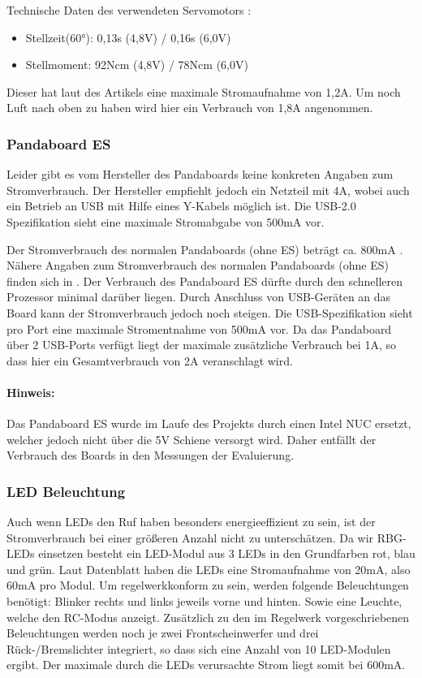 Technische Daten des verwendeten Servomotors \cite{website-servo-dat}:
\begin{itemize}
 \item Stellzeit(60°): 0,13s (4,8V) / 0,16s (6,0V)
 \item Stellmoment: 92Ncm (4,8V) / 78Ncm (6,0V)
\end{itemize}



Dieser hat laut des Artikels eine maximale Stromaufnahme von 1,2A. Um noch Luft nach oben zu haben wird hier ein Verbrauch von 
1,8A angenommen.

\subsubsection{Pandaboard ES}
Leider gibt es vom Hersteller des Pandaboards keine konkreten Angaben zum Stromverbrauch. Der Hersteller empfiehlt jedoch ein
Netzteil mit 4A\cite{website-panda-supply}, wobei auch ein Betrieb an USB mit Hilfe eines Y-Kabels möglich ist. Die USB-2.0 Spezifikation\cite{website-usb-spec} sieht eine maximale 
Stromabgabe von 500mA vor.

Der Stromverbrauch des normalen Pandaboards (ohne ES) beträgt ca. 800mA \cite{website-panda-power}.
Nähere Angaben zum Stromverbrauch des normalen Pandaboards (ohne ES) finden sich in \cite{website-panda-power}.
Der Verbrauch des Pandaboard ES dürfte durch den schnelleren Prozessor minimal darüber liegen. 
Durch Anschluss von USB-Geräten an das Board kann der Stromverbrauch jedoch noch steigen. Die USB-Spezifikation \cite{website-usb-spec}
sieht pro Port eine maximale Stromentnahme von 500mA vor. Da das Pandaboard über 2 USB-Ports verfügt liegt der maximale zusätzliche Verbrauch bei 1A,
so dass hier ein Gesamtverbrauch von 2A veranschlagt wird.

\paragraph{Hinweis:}
Das Pandaboard ES wurde im Laufe des Projekts durch einen Intel NUC ersetzt, welcher jedoch nicht über die 5V Schiene versorgt wird.
Daher entfällt der Verbrauch des Boards in den Messungen der Evaluierung.

\subsubsection{LED Beleuchtung}
Auch wenn LEDs den Ruf haben besonders energieeffizient zu sein, ist der Stromverbrauch bei einer größeren Anzahl nicht zu
unterschätzen. Da wir RBG-LEDs einsetzen besteht ein LED-Modul aus 3 LEDs in den Grundfarben rot, blau und grün.
Laut Datenblatt \cite{ds-WS2812} haben die LEDs eine Stromaufnahme von 20mA, also 60mA pro Modul.
Um regelwerkkonform zu sein, werden folgende Beleuchtungen benötigt: Blinker rechts und links jeweils vorne und hinten.
Sowie eine Leuchte, welche den RC-Modus anzeigt. Zusätzlich zu den im Regelwerk vorgeschriebenen Beleuchtungen werden noch je
zwei Frontscheinwerfer und drei Rück-/Bremslichter integriert, so dass sich eine Anzahl von 10 LED-Modulen ergibt.
Der maximale durch die LEDs verursachte Strom liegt somit bei 600mA. 

